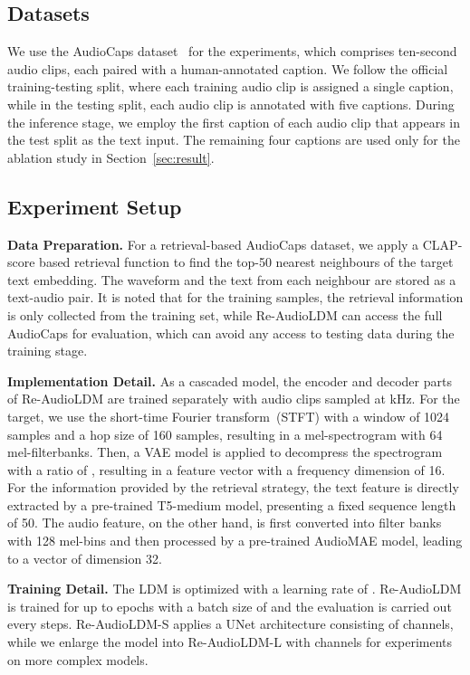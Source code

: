 \documentclass{article}
\begin{document}
\subsection{Datasets}
We use the AudioCaps dataset~\cite{tau2019} for the experiments, which comprises  ten-second audio clips, each paired with a human-annotated caption. We follow the official training-testing split, where each training audio clip is assigned a single caption, while in the testing split, each audio clip is annotated with five captions. During the inference stage, we employ the first caption of each audio clip that appears in the test split as the text input. The remaining four captions are used only for the ablation study in Section~\ref{sec:result}.

\subsection{Experiment Setup}

\textbf{Data Preparation.}
For a retrieval-based AudioCaps dataset, we apply a CLAP-score based retrieval function to find the top-50 nearest neighbours of the target text embedding. The waveform and the text from each neighbour are stored as a text-audio pair. It is noted that for the training samples, the retrieval information is only collected from the training set, while Re-AudioLDM can access the full AudioCaps for evaluation, which can avoid any access to testing data during the training stage.

\noindent
\textbf{Implementation Detail.}
As a cascaded model, the encoder and decoder parts of Re-AudioLDM are trained separately with audio clips sampled at  kHz. For the target, we use the short-time Fourier transform~(STFT) with a window of 1024 samples and a hop size of 160 samples, resulting in a mel-spectrogram with 64 mel-filterbanks. Then, a VAE model is applied to decompress the spectrogram with a ratio of , resulting in a feature vector with a frequency dimension of 16. For the information provided by the retrieval strategy, the text feature is directly extracted by a pre-trained T5-medium model, presenting a fixed sequence length of 50. The audio feature, on the other hand, is first converted into filter banks with 128 mel-bins and then processed by a pre-trained AudioMAE model, leading to a vector of dimension 32. 

\noindent
\textbf{Training Detail.}
The LDM is optimized with a learning rate of . Re-AudioLDM is trained for up to  epochs with a batch size of  and the evaluation is carried out every  steps. Re-AudioLDM-S applies a UNet architecture consisting of  channels, while we enlarge the model into Re-AudioLDM-L with  channels for experiments on more complex models. 
\end{document}

